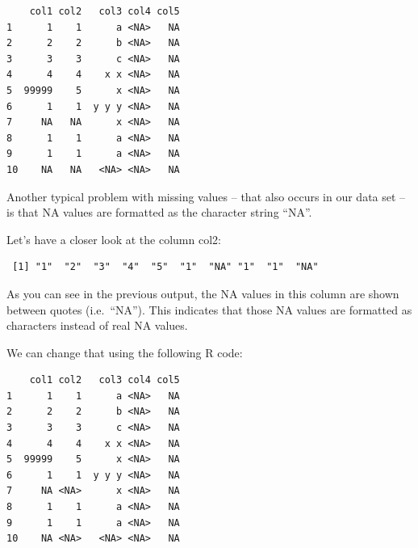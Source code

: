 \documentclass[
  letterpaper,
  DIV=11,
  numbers=noendperiod]{scrreprt}
\newenvironment{Shaded}{\begin{snugshade}}{\end{snugshade}}
\newcommand{\CommentTok}[1]{\textcolor[rgb]{0.37,0.37,0.37}{#1}}
\newcommand{\ConstantTok}[1]{\textcolor[rgb]{0.56,0.35,0.01}{#1}}
\newcommand{\NormalTok}[1]{\textcolor[rgb]{0.00,0.23,0.31}{#1}}
\newcommand{\OtherTok}[1]{\textcolor[rgb]{0.00,0.23,0.31}{#1}}
\newcommand{\SpecialCharTok}[1]{\textcolor[rgb]{0.37,0.37,0.37}{#1}}
\newcommand{\StringTok}[1]{\textcolor[rgb]{0.13,0.47,0.30}{#1}}
\begin{document}
\begin{verbatim}
    col1 col2   col3 col4 col5
1      1    1      a <NA>   NA
2      2    2      b <NA>   NA
3      3    3      c <NA>   NA
4      4    4    x x <NA>   NA
5  99999    5      x <NA>   NA
6      1    1  y y y <NA>   NA
7     NA   NA      x <NA>   NA
8      1    1      a <NA>   NA
9      1    1      a <NA>   NA
10    NA   NA   <NA> <NA>   NA
\end{verbatim}

Another typical problem with missing values -- that also occurs in our
data set -- is that NA values are formatted as the character string
``NA''.

Let's have a closer look at the column col2:

\begin{Shaded}
\end{Shaded}

\begin{verbatim}
 [1] "1"  "2"  "3"  "4"  "5"  "1"  "NA" "1"  "1"  "NA"
\end{verbatim}

As you can see in the previous output, the NA values in this column are
shown between quotes (i.e.~``NA''). This indicates that those NA values
are formatted as characters instead of real NA values.

We can change that using the following R code:

\begin{Shaded}
\end{Shaded}

\begin{verbatim}
    col1 col2   col3 col4 col5
1      1    1      a <NA>   NA
2      2    2      b <NA>   NA
3      3    3      c <NA>   NA
4      4    4    x x <NA>   NA
5  99999    5      x <NA>   NA
6      1    1  y y y <NA>   NA
7     NA <NA>      x <NA>   NA
8      1    1      a <NA>   NA
9      1    1      a <NA>   NA
10    NA <NA>   <NA> <NA>   NA
\end{verbatim}
\end{document}
